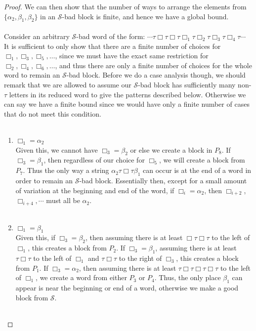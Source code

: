 \documentclass[11pt]{amsart}
\theoremstyle{definition}
\theoremstyle{remark}
\numberwithin{equation}{section}
\begin{document}
\begin{proof}
We can then show that the number of ways to arrange the elements from $ \{ \alpha_{2}, \beta_{1}, \beta_{2} \} $ in an $\mathcal{S}$-bad block is finite, and hence we have a global bound.  \\ \\
Consider an arbitrary $\mathcal{S}$-bad word of the form: $\cdots \tau \Box \tau \Box \tau \Box_{1} \tau \Box_{2} \tau \Box_{3} \tau \Box_{4} \tau \cdots $ It is sufficient to only show that there are a finite number of choices for $\Box_{1}, \Box_{3}, \Box_{5}, \ldots$, since we must have the exact same restriction for $\Box_{2}, \Box_{4}, \Box_{6}, \ldots$, and thus there are only a finite number of choices for the whole word to remain an $\mathcal{S}$-bad block. Before we do a case analysis though, we should remark that we are allowed to assume our $\mathcal{S}$-bad block has sufficiently many non-$\tau$ letters in its reduced word to give the patterns described below. Otherwise we can say we have a finite bound since we would have only a finite number of cases that do not meet this condition.  \\ \\
\begin{enumerate}
\item $\Box_{1} = \alpha_{2}$ \\
Given this, we cannot have $\Box_{3} = \beta_{2}$ or else we create a block in $P_{8}$. If $\Box_{3} = \beta_{1}$, then regardless of our choice for $\Box_{5}$, we will create a block from $P_{7}$. Thus the only way a string  $\alpha_{2} \tau \Box \tau \beta_{1}$ can occur is at the end of a word in order to remain an $\mathcal{S}$-bad block. Essentially then, except for a small amount of variation at the beginning and end of the word, if $\Box_{i} = \alpha_{2}$, then $\Box_{i+2}$, $\Box_{i+4}, \cdots$ must all be $\alpha_{2}$.  \\ \\
\item $\Box_{1} = \beta_{1}$ \\ 
Given this, if $\Box_{3} = \beta_{2}$, then assuming there is at least $\Box \tau \Box \tau$ to the left of $\Box_{1}$, this creates a block from $P_{2}$. If $\Box_{3} = \beta_{1}$, assuming there is at least $\tau \Box \tau$ to the left of $\Box_{1}$ and $\tau \Box \tau$ to the right of $\Box_{3}$, this creates a block from $P_{1}$.  If $\Box_{3} = \alpha_{2}$, then assuming there is at least $\tau \Box \tau \Box \tau \Box \tau$ to the left of $\Box_{1}$, we create a word from either $P_{3}$ or $P_{4}$. Thus, the only place $\beta_{1}$ can appear is near the beginning or end of a word, otherwise we make a good block from $\mathcal{S}$. \\ \\

\end{enumerate}
\end{proof}
\end{document}
